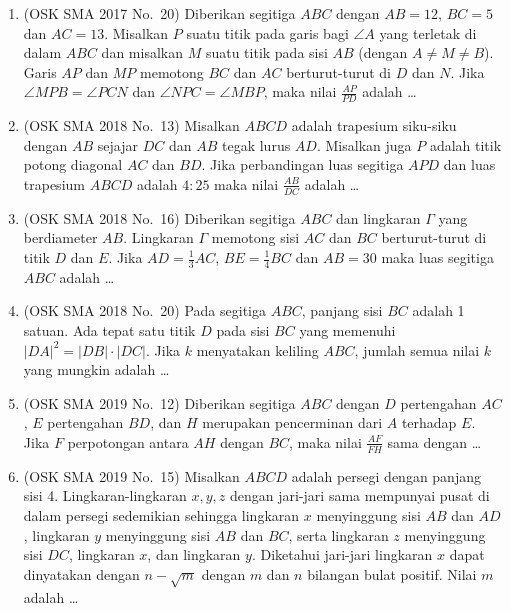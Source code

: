 \documentclass[12pt,a4paper]{article}
\begin{document}
\begin{enumerate}
\item (OSK SMA 2017 No.\ 20) Diberikan segitiga $ABC$ dengan $AB=12$, $BC=5$ dan $AC=13$. Misalkan $P$ suatu titik pada garis bagi $\angle A$ yang terletak di dalam $ABC$ dan misalkan $M$ suatu titik pada sisi $AB$ (dengan $A\ne M\ne B$). Garis $AP$ dan $MP$ memotong $BC$ dan $AC$ berturut-turut di $D$ dan $N$. Jika $\angle MPB = \angle PCN$ dan $\angle NPC = \angle MBP$, maka nilai $\frac{AP}{PD}$ adalah \dots

\item (OSK SMA 2018 No.\ 13) Misalkan $ABCD$ adalah trapesium siku-siku dengan $AB$ sejajar $DC$ dan $AB$ tegak lurus $AD$. Misalkan juga $P$ adalah titik potong diagonal $AC$ dan $BD$. Jika perbandingan luas segitiga $APD$ dan luas trapesium $ABCD$ adalah $4:25$ maka nilai $\frac{AB}{DC}$ adalah \dots

\item (OSK SMA 2018 No.\ 16) Diberikan segitiga $ABC$ dan lingkaran $\Gamma$ yang berdiameter $AB$. Lingkaran $\Gamma$ memotong sisi $AC$ dan $BC$ berturut-turut di titik $D$ dan $E$. Jika $AD=\frac{1}{3}AC$, $BE=\frac{1}{4}BC$ dan $AB=30$ maka luas segitiga $ABC$ adalah \dots

\item (OSK SMA 2018 No.\ 20) Pada segitiga $ABC$, panjang sisi $BC$ adalah 1 satuan. Ada tepat satu titik $D$ pada sisi $BC$ yang memenuhi $|DA|^{2}=|DB|\cdot|DC|$. Jika $k$ menyatakan keliling $ABC$, jumlah semua nilai $k$ yang mungkin adalah \dots

\item (OSK SMA 2019 No.\ 12) Diberikan segitiga $ABC$ dengan $D$ pertengahan $AC$, $E$ pertengahan $BD$, dan $H$ merupakan pencerminan dari $A$ terhadap $E$. Jika $F$ perpotongan antara $AH$ dengan $BC$, maka nilai $\frac{AF}{FH}$ sama dengan \dots

\item (OSK SMA 2019 No.\ 15) Misalkan $ABCD$ adalah persegi dengan panjang sisi 4. Lingkaran-lingkaran $x, y, z$ dengan jari-jari sama mempunyai pusat di dalam persegi sedemikian sehingga lingkaran $x$ menyinggung sisi $AB$ dan $AD$, lingkaran $y$ menyinggung sisi $AB$ dan $BC$, serta lingkaran $z$ menyinggung sisi $DC$, lingkaran $x$, dan lingkaran $y$. Diketahui jari-jari lingkaran $x$ dapat dinyatakan dengan $n-\sqrt{m}$ dengan $m$ dan $n$ bilangan bulat positif. Nilai $m$ adalah \dots


\end{enumerate}
\end{document}
